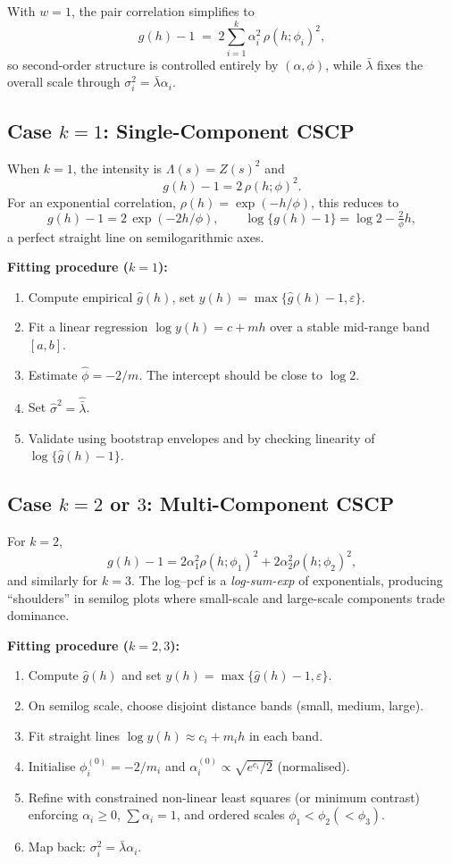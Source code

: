 \documentclass[11pt]{article}
\begin{document}
With $w=1$, the pair correlation simplifies to
\[
g(h)-1 \;=\; 2 \sum_{i=1}^k \alpha_i^2 \,\rho(h;\phi_i)^2,
\]
so second-order structure is controlled entirely by $(\alpha,\phi)$, while $\bar\lambda$ fixes the overall scale through $\sigma_i^2 = \bar\lambda \alpha_i$.

\subsection{Case $k=1$: Single-Component CSCP}
When $k=1$, the intensity is $\Lambda(s)=Z(s)^2$ and
\[
g(h)-1 = 2\,\rho(h;\phi)^2.
\]
For an exponential correlation, $\rho(h)=\exp(-h/\phi)$, this reduces to
\[
g(h)-1 = 2\,\exp(-2h/\phi),
\qquad
\log\{g(h)-1\} = \log 2 - \tfrac{2}{\phi}h,
\]
a perfect straight line on semilogarithmic axes.  

\noindent\textbf{Fitting procedure ($k=1$):}
\begin{enumerate}
	\item Compute empirical $\hat g(h)$, set $y(h)=\max\{\hat g(h)-1,\varepsilon\}$.
	\item Fit a linear regression $\log y(h) = c + m h$ over a stable mid-range band $[a,b]$.
	\item Estimate $\hat\phi = -2/m$. The intercept should be close to $\log 2$.
	\item Set $\hat\sigma^2 = \hat{\bar\lambda}$.
	\item Validate using bootstrap envelopes and by checking linearity of $\log\{\hat g(h)-1\}$.
\end{enumerate}

\subsection{Case $k=2$ or $3$: Multi-Component CSCP}
For $k=2$,
\[
g(h)-1 = 2\alpha_1^2 \rho(h;\phi_1)^2 + 2\alpha_2^2 \rho(h;\phi_2)^2,
\]
and similarly for $k=3$. The log--pcf is a \emph{log-sum-exp} of exponentials, producing ``shoulders'' in semilog plots where small-scale and large-scale components trade dominance.

\noindent\textbf{Fitting procedure ($k=2,3$):}
\begin{enumerate}
	\item Compute $\hat g(h)$ and set $y(h)=\max\{\hat g(h)-1,\varepsilon\}$.
	\item On semilog scale, choose disjoint distance bands (small, medium, large).
	\item Fit straight lines $\log y(h) \approx c_i + m_i h$ in each band.
	\item Initialise $\phi_i^{(0)} = -2/m_i$ and $\alpha_i^{(0)} \propto \sqrt{e^{c_i}/2}$ (normalised).
	\item Refine with constrained non-linear least squares (or minimum contrast) enforcing $\alpha_i\ge 0$, $\sum \alpha_i=1$, and ordered scales $\phi_1<\phi_2(<\phi_3)$.
	\item Map back: $\sigma_i^2 = \bar\lambda \alpha_i$.
\end{enumerate}
\end{document}
